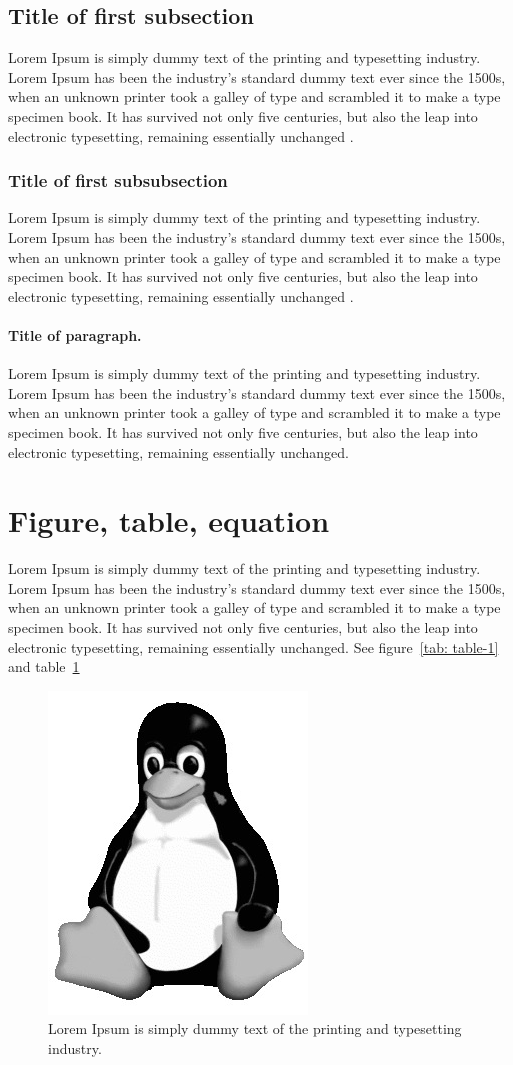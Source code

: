 \documentclass[3p,preprint,authoryear]{elsarticle}
\begin{document}
\subsection{Title of first subsection}
Lorem Ipsum is simply dummy text of the printing and typesetting industry. Lorem Ipsum has been the industry's standard dummy text ever since the 1500s, when an unknown printer took a galley of type and scrambled it to make a type specimen book. It has survived not only five centuries, but also the leap into electronic typesetting, remaining essentially unchanged \citep{Magnetisma}.

\subsubsection{Title of first subsubsection}
Lorem Ipsum is simply dummy text of the printing and typesetting industry. Lorem Ipsum has been the industry's standard dummy text ever since the 1500s, when an unknown printer took a galley of type and scrambled it to make a type specimen book. It has survived not only five centuries, but also the leap into electronic typesetting, remaining essentially unchanged \citep{Magnetisma}.

\paragraph{Title of paragraph.}
Lorem Ipsum is simply dummy text of the printing and typesetting industry. Lorem Ipsum has been the industry's standard dummy text ever since the 1500s, when an unknown printer took a galley of type and scrambled it to make a type specimen book. It has survived not only five centuries, but also the leap into electronic typesetting, remaining essentially unchanged.

\section{Figure, table, equation}
Lorem Ipsum is simply dummy text of the printing and typesetting industry. Lorem Ipsum has been the industry's standard dummy text ever since the 1500s, when an unknown printer took a galley of type and scrambled it to make a type specimen book. It has survived not only five centuries, but also the leap into electronic typesetting, remaining essentially unchanged. See figure~\ref{tab: table-1} and table~\ref{fig:logo}

\begin{figure}[tbp]
	\centering
	\includegraphics[width=0.25\linewidth]{gfx}
	\caption{Lorem Ipsum is simply dummy text of the printing and typesetting industry.}
	\label{fig:logo}
\end{figure}
\end{document}
